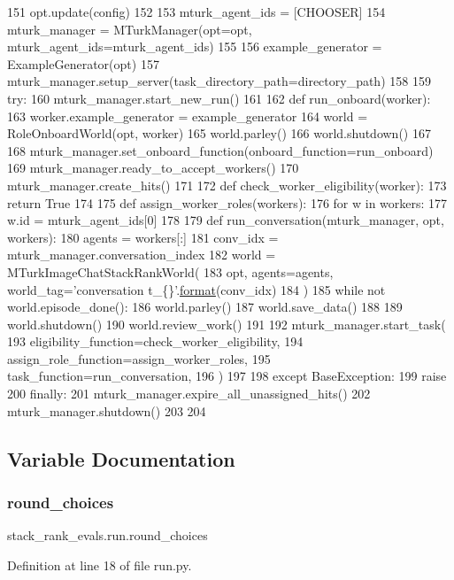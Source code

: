 \begin{DoxyCode}
151     opt.update(config)
152 
153     mturk\_agent\_ids = [CHOOSER]
154     mturk\_manager = MTurkManager(opt=opt, mturk\_agent\_ids=mturk\_agent\_ids)
155 
156     example\_generator = ExampleGenerator(opt)
157     mturk\_manager.setup\_server(task\_directory\_path=directory\_path)
158 
159     \textcolor{keywordflow}{try}:
160         mturk\_manager.start\_new\_run()
161 
162         \textcolor{keyword}{def }run\_onboard(worker):
163             worker.example\_generator = example\_generator
164             world = RoleOnboardWorld(opt, worker)
165             world.parley()
166             world.shutdown()
167 
168         mturk\_manager.set\_onboard\_function(onboard\_function=run\_onboard)
169         mturk\_manager.ready\_to\_accept\_workers()
170         mturk\_manager.create\_hits()
171 
172         \textcolor{keyword}{def }check\_worker\_eligibility(worker):
173             \textcolor{keywordflow}{return} \textcolor{keyword}{True}
174 
175         \textcolor{keyword}{def }assign\_worker\_roles(workers):
176             \textcolor{keywordflow}{for} w \textcolor{keywordflow}{in} workers:
177                 w.id = mturk\_agent\_ids[0]
178 
179         \textcolor{keyword}{def }run\_conversation(mturk\_manager, opt, workers):
180             agents = workers[:]
181             conv\_idx = mturk\_manager.conversation\_index
182             world = MTurkImageChatStackRankWorld(
183                 opt, agents=agents, world\_tag=\textcolor{stringliteral}{'conversation t\_\{\}'}.\hyperlink{namespaceparlai_1_1chat__service_1_1services_1_1messenger_1_1shared__utils_a32e2e2022b824fbaf80c747160b52a76}{format}(conv\_idx)
184             )
185             \textcolor{keywordflow}{while} \textcolor{keywordflow}{not} world.episode\_done():
186                 world.parley()
187             world.save\_data()
188 
189             world.shutdown()
190             world.review\_work()
191 
192         mturk\_manager.start\_task(
193             eligibility\_function=check\_worker\_eligibility,
194             assign\_role\_function=assign\_worker\_roles,
195             task\_function=run\_conversation,
196         )
197 
198     \textcolor{keywordflow}{except} BaseException:
199         \textcolor{keywordflow}{raise}
200     \textcolor{keywordflow}{finally}:
201         mturk\_manager.expire\_all\_unassigned\_hits()
202         mturk\_manager.shutdown()
203 
204 
\end{DoxyCode}


\subsection{Variable Documentation}
\mbox{\label{namespacestack__rank__evals_1_1run_a7da608ae54872ed1fb55c4c87600cf99}} 
\subsubsection{\texorpdfstring{round\+\_\+choices}{round\_choices}}
{\footnotesize\ttfamily stack\+\_\+rank\+\_\+evals.\+run.\+round\+\_\+choices}



Definition at line 18 of file run.\+py.

